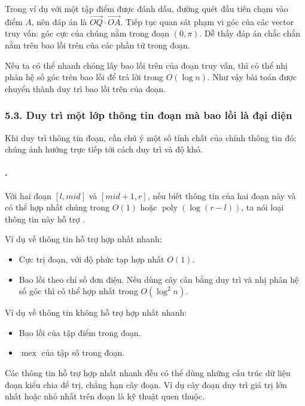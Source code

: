 \documentclass[11pt]{article}
\begin{document}
Trong ví dụ với một tập điểm được đánh dấu, đường quét đầu tiên chạm vào điểm
\(A\), nên đáp án là \(\overrightarrow{OQ}\cdot
\overrightarrow{OA}\). Tiếp tục quan sát phạm vi góc của các vector truy vấn:
góc cực của chúng nằm trong đoạn \((0,\pi)\). Dễ thấy đáp án chắc chắn nằm
trên bao lồi trên của các phần tử trong đoạn.

Nếu ta có thể nhanh chóng lấy bao lồi trên của đoạn truy vấn, thì có thể nhị
phân hệ số góc trên bao lồi để trả lời trong \(O(\log n)\). Như vậy bài toán
được chuyển thành duy trì bao lồi trên của đoạn.

\subsubsection*{5.3. Duy trì một lớp thông tin đoạn mà bao lồi là đại diện}

Khi duy trì thông tin đoạn, cần chú ý một số tính chất của chính thông tin đó;
chúng ảnh hưởng trực tiếp tới cách duy trì và độ khó.

\paragraph{.}
Với hai đoạn \([l,\mathit{mid}]\) và \([\mathit{mid}+1,r]\), nếu biết thông
tin của hai đoạn này và có thể hợp nhất chúng trong \(O(1)\) hoặc
\(\operatorname{poly}(\log(r-l))\), ta nói loại thông tin này hỗ trợ
.

Ví dụ về thông tin hỗ trợ hợp nhất nhanh:
\begin{itemize}
  \item Cực trị đoạn, với độ phức tạp hợp nhất \(O(1)\).
  \item Bao lồi theo chỉ số đơn điệu. Nếu dùng cây cân bằng duy trì và nhị
  phân hệ số góc thì có thể hợp nhất trong \(O(\log^2 n)\).
\end{itemize}

Ví dụ về thông tin không hỗ trợ hợp nhất nhanh:
\begin{itemize}
  \item Bao lồi của tập điểm trong đoạn.
  \item \(\operatorname{mex}\) của tập số trong đoạn.
\end{itemize}

Các thông tin hỗ trợ hợp nhất nhanh đều có thể dùng những cấu trúc dữ liệu
đoạn kiểu chia để trị, chẳng hạn cây đoạn. Ví dụ cây đoạn duy trì giá trị lớn
nhất hoặc nhỏ nhất trên đoạn là kỹ thuật quen thuộc.
\end{document}

